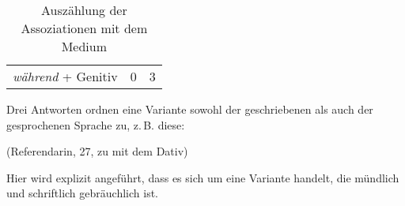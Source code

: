 \begin{table}
\begin{tabular}{lrr}
\textit{während} + Genitiv   & 0                                                                                                              & 3                                                                                                               \\ 
\end{tabular}
\caption{Auszählung der Assoziationen mit dem Medium}
\label{table:AssMedium}
\end{table}

Drei Antworten ordnen eine Variante sowohl der geschriebenen als auch der gesprochenen Sprache zu, z.\,B. diese: 
\begin{exe}
\ex {} (Referendarin, 27, zu \dank{} mit dem Dativ)
\end{exe}
Hier wird explizit angeführt, dass es sich um eine Variante handelt, die mündlich und schriftlich gebräuchlich ist. 

